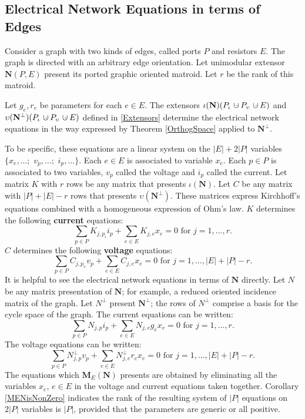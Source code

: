 \documentclass[12pt]{article}
\theoremstyle{definition}
\newcommand{\dunion}
{\mbox{\hbox{\hskip6pt$\cdot$\hskip-5.50pt$\cup$\hskip2pt}}}
\newcommand{\Is}{\ensuremath{\iota}}
\newcommand{\Vs}{\ensuremath{\upsilon}}
\newcommand{\Card}[1]{\ensuremath{{\left|#1\right|}}}
\newcommand{\ext}[1]{\ensuremath{\mathbf{#1}}}
\begin{document}
\subsection{Electrical Network Equations in terms of Edges}
\label{ElecNetEquatSec}
Consider a graph with two kinds of edges, called ports $P$ and
resistors $E$.  The graph is directed with an arbitrary edge 
orientation.  Let unimodular extensor $\ext{N}(P,E)$ present
its ported graphic oriented matroid.  Let $r$ be the rank of
this matroid.

Let $g_e,r_e$ be parameters for each $e\in E$.  The extensors
$\Is(\ext{N})(P_\Is\dunion P_\Vs\dunion E)$
and 
$\Vs(\ext{N}^\perp)(P_\Is\dunion P_\Vs\dunion E)$ defined in \textsection
\ref{Extensors} determine the electrical network equations in the
way expressed by Theorem \ref{OrthogSpace} applied to $\ext{N}^\perp$.

To be specific, these equations are a linear system on the
$\Card{E}+2\Card{P}$ variables $\{x_e,\ldots;$
$ v_p,\ldots;$
$ i_p,\ldots\}$.
Each $e\in E$ is associated to variable $x_e$.  Each $p\in P$ is 
associated to two variables, $v_p$ called the voltage and 
$i_p$ called the current.
Let matrix $K$ with $r$ rows be any matrix that presents
$\Is(\ext{N})$.   Let $C$ be any matrix
with $\Card{P}+\Card{E}-r$ rows that presents $\Vs(\ext{N}^\perp)$.  
These matrices express 
Kirchhoff's equations combined with a homogeneous expression of Ohm's
law.
$K$ determines the following \textbf{current} equations:
\[
\sum_{p\in P}K_{j,p_\Is} i_p + \sum_{e\in E}K_{j,e}x_e = 0
\text{ for } j = 1, \ldots, r.
\]
$C$ determines the following \textbf{voltage} equations:
\[
\sum_{p\in P}C_{j,p_\Vs} v_p + \sum_{e\in E}C_{j,e}x_e = 0
\text{ for } j = 1, \ldots, \Card{E}+\Card{P} -r.
\]
It is helpful to see the electrical network equations in terms of 
$\ext{N}$ directly.  Let $N$ be any matrix presentation of $\ext{N}$; 
for example, a reduced oriented incidence matrix of the graph.
Let $N^\perp$ present $\ext{N}^\perp$; the rows of $N^\perp$ comprise a
basis for the cycle space of the graph.  The current equations can 
be written:
\[
\sum_{p\in P}N_{j,p} i_p + \sum_{e\in E}N_{j,e}g_ex_e = 0
\text{ for } j = 1, \ldots, r.
\]
The voltage equations can be written:
\[
\sum_{p\in P}N^\perp_{j,p} v_p + \sum_{e\in E}N^\perp_{j,e}r_ex_e = 0
\text{ for } j = 1, \ldots, \Card{E}+\Card{P} -r.
\]
The equations which $\ext{M}_E(\ext{N})$ 
presents are obtained by eliminating all 
the variables $x_e$, $e\in E$ in
the voltage and current equations taken together.  
Corollary \ref{MENisNonZero} indicates the rank of the resulting system
of $\Card{P}$ equations on $2\Card{P}$ variables is $\Card{P}$, provided that 
the parameters are generic or all positive.
\end{document}
